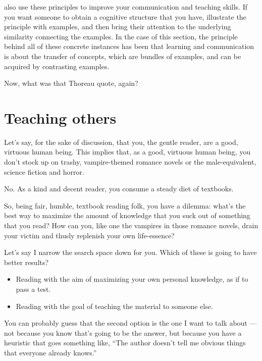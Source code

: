  also use these principles to improve your communication and
teaching skills. If you want someone to obtain a cognitive structure
that you have, illustrate the principle with examples, and then bring
their attention to the underlying similarity connecting the examples. In
the case of this section, the principle behind all of these concrete instances has
been that learning and communication is about the transfer of concepts,
which are bundles of examples, and can be acquired by contrasting examples.

Now, what was that Thoreau quote, again?

\section{Teaching others}

Let's say, for the sake of discussion, that you, the gentle reader, are
a good, virtuous human being. This implies that, as a good, virtuous
human being, you don't stock up on trashy, vampire-themed romance novels
or the male-equivalent, science fiction and horror.

No. As a kind and decent reader, you consume a steady diet of textbooks.

So, being fair, humble, textbook reading folk, you have a dilemma:
what's the best way to maximize the amount of knowledge that you suck
out of something that you read? How can you, like one the
vampires in those romance novels, drain your victim and thusly replenish your own life-essence?

Let's say I narrow the search space down for you. Which of these is going to have
better results?

\begin{itemize}
\itemsep1pt\parskip0pt
\item
  Reading with the aim of maximizing your own personal knowledge, as if to pass a test.
\item
  Reading with the goal of teaching the material to someone else.
\end{itemize}

You can probably guess that the second option is the one I want to talk
about --- not because you know that's going to be the answer, but because
you have a heuristic that goes something like, ``The author doesn't tell
me obvious things that everyone already knows.''

